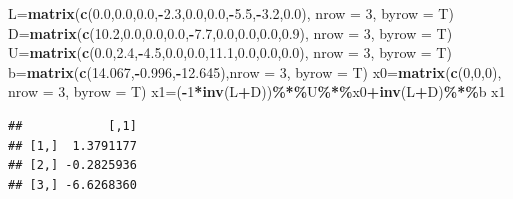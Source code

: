 \documentclass[
]{article}
\newenvironment{Shaded}{\begin{snugshade}}{\end{snugshade}}
\newcommand{\AttributeTok}[1]{\textcolor[rgb]{0.13,0.29,0.53}{#1}}
\newcommand{\DecValTok}[1]{\textcolor[rgb]{0.00,0.00,0.81}{#1}}
\newcommand{\FloatTok}[1]{\textcolor[rgb]{0.00,0.00,0.81}{#1}}
\newcommand{\FunctionTok}[1]{\textcolor[rgb]{0.13,0.29,0.53}{\textbf{#1}}}
\newcommand{\NormalTok}[1]{#1}
\newcommand{\OtherTok}[1]{\textcolor[rgb]{0.56,0.35,0.01}{#1}}
\newcommand{\SpecialCharTok}[1]{\textcolor[rgb]{0.81,0.36,0.00}{\textbf{#1}}}
\begin{document}
\begin{Shaded}
\begin{Highlighting}[]
\NormalTok{  L}\OtherTok{=}\FunctionTok{matrix}\NormalTok{(}\FunctionTok{c}\NormalTok{(}\FloatTok{0.0}\NormalTok{,}\FloatTok{0.0}\NormalTok{,}\FloatTok{0.0}\NormalTok{,}\SpecialCharTok{{-}}\FloatTok{2.3}\NormalTok{,}\FloatTok{0.0}\NormalTok{,}\FloatTok{0.0}\NormalTok{,}\SpecialCharTok{{-}}\FloatTok{5.5}\NormalTok{,}\SpecialCharTok{{-}}\FloatTok{3.2}\NormalTok{,}\FloatTok{0.0}\NormalTok{), }\AttributeTok{nrow =} \DecValTok{3}\NormalTok{, }\AttributeTok{byrow =}\NormalTok{ T)}
\NormalTok{  D}\OtherTok{=}\FunctionTok{matrix}\NormalTok{(}\FunctionTok{c}\NormalTok{(}\FloatTok{10.2}\NormalTok{,}\FloatTok{0.0}\NormalTok{,}\FloatTok{0.0}\NormalTok{,}\FloatTok{0.0}\NormalTok{,}\SpecialCharTok{{-}}\FloatTok{7.7}\NormalTok{,}\FloatTok{0.0}\NormalTok{,}\FloatTok{0.0}\NormalTok{,}\FloatTok{0.0}\NormalTok{,}\FloatTok{0.9}\NormalTok{), }\AttributeTok{nrow =} \DecValTok{3}\NormalTok{, }\AttributeTok{byrow =}\NormalTok{ T)}
\NormalTok{  U}\OtherTok{=}\FunctionTok{matrix}\NormalTok{(}\FunctionTok{c}\NormalTok{(}\FloatTok{0.0}\NormalTok{,}\FloatTok{2.4}\NormalTok{,}\SpecialCharTok{{-}}\FloatTok{4.5}\NormalTok{,}\FloatTok{0.0}\NormalTok{,}\FloatTok{0.0}\NormalTok{,}\FloatTok{11.1}\NormalTok{,}\FloatTok{0.0}\NormalTok{,}\FloatTok{0.0}\NormalTok{,}\FloatTok{0.0}\NormalTok{), }\AttributeTok{nrow =} \DecValTok{3}\NormalTok{, }\AttributeTok{byrow =}\NormalTok{ T)}
\NormalTok{  b}\OtherTok{=}\FunctionTok{matrix}\NormalTok{(}\FunctionTok{c}\NormalTok{(}\FloatTok{14.067}\NormalTok{,}\SpecialCharTok{{-}}\FloatTok{0.996}\NormalTok{,}\SpecialCharTok{{-}}\FloatTok{12.645}\NormalTok{),}\AttributeTok{nrow =} \DecValTok{3}\NormalTok{, }\AttributeTok{byrow =}\NormalTok{ T)}
\NormalTok{  x0}\OtherTok{=}\FunctionTok{matrix}\NormalTok{(}\FunctionTok{c}\NormalTok{(}\DecValTok{0}\NormalTok{,}\DecValTok{0}\NormalTok{,}\DecValTok{0}\NormalTok{), }\AttributeTok{nrow =} \DecValTok{3}\NormalTok{, }\AttributeTok{byrow =}\NormalTok{ T)}
\NormalTok{ x1}\OtherTok{=}\NormalTok{(}\SpecialCharTok{{-}}\DecValTok{1}\SpecialCharTok{*}\FunctionTok{inv}\NormalTok{(L}\SpecialCharTok{+}\NormalTok{D))}\SpecialCharTok{\%*\%}\NormalTok{U}\SpecialCharTok{\%*\%}\NormalTok{x0}\SpecialCharTok{+}\FunctionTok{inv}\NormalTok{(L}\SpecialCharTok{+}\NormalTok{D)}\SpecialCharTok{\%*\%}\NormalTok{b}
\NormalTok{x1}
\end{Highlighting}
\end{Shaded}

\begin{verbatim}
##            [,1]
## [1,]  1.3791177
## [2,] -0.2825936
## [3,] -6.6268360
\end{verbatim}
\end{document}
